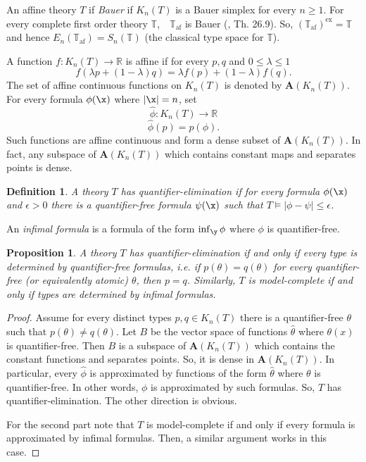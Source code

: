 \documentclass[12pt]{article}
\newtheorem{proposition}[theorem]{Proposition}
\newtheorem{definition}[theorem]{Definition}
\def\Rn{\mathbb R}
\begin{document}
An affine theory $T$ if \emph{Bauer} if $K_n(T)$ is a Bauer simplex for every $n\geqslant1$.
For every complete first order theory $\mathbb{T}$,\ \ $\mathbb{T}_{\textrm{af}}$ is Bauer
(\cite{Ibarlucia}, Th. 26.9).
So, $(\mathbb{T}_{\textrm{af}})^{\textrm{ex}}=\mathbb{T}$ and hence
$E_n(\mathbb{T}_{\textrm{af}})=S_n(\mathbb{T})$ (the classical type space for $\mathbb{T}$).

A function $f:K_n(T)\rightarrow\Rn$ is affine if for every $p,q$ and $0\leqslant\lambda\leqslant1$
$$f(\lambda p+(1-\lambda)q)=\lambda f(p)+(1-\lambda)f(q).$$
The set of affine continuous functions on $K_n(T)$ is denoted by $\mathbf{A}(K_n(T))$.
For every formula $\phi(\x)$ where $|\x|=n$, set $$\hat\phi:K_n(T)\rightarrow\Rn$$
$$\hat\phi(p)=p(\phi).$$
Such functions are affine continuous and form a dense subset of $\mathbf{A}(K_n(T))$.
In fact, any subspace of $\mathbf{A}(K_n(T))$ which contains constant maps and separates points
is dense.

\begin{definition} \em{A theory $T$ has \emph{quantifier-elimination} if for every formula $\phi(\x)$ and $\epsilon>0$
there is a quantifier-free formula $\psi(\x)$ such that $T\vDash|\phi-\psi|\leqslant\epsilon$.}
\end{definition}

An \emph{infimal formula} is a formula of the form $\inf_{\y}\phi$ where $\phi$ is quantifier-free.

\begin{proposition}\label{separation}
A theory $T$ has quantifier-elimination if and only if every type is determined by quantifier-free formulas,
i.e. if $p(\theta)=q(\theta)$ for every quantifier-free (or equivalently atomic) $\theta$, then $p=q$.
Similarly, $T$ is model-complete if and only if types are determined by infimal formulas.
\end{proposition}
\begin{proof}
Assume for every distinct types $p,q\in K_n(T)$ there is a quantifier-free $\theta$ such that
$p(\theta)\neq q(\theta)$.
Let $B$ be the vector space of functions $\hat\theta$ where $\theta(x)$ is quantifier-free.
Then $B$ is a subspace of $\mathbf{A}(K_n(T))$ which contains the constant functions and separates points.
So, it is dense in $\mathbf{A}(K_n(T))$. In particular, every $\hat\phi$ is approximated by
functions of the form $\hat\theta$ where $\theta$ is quantifier-free. In other words,
$\phi$ is approximated by such formulas. So, $T$ has quantifier-elimination.
The other direction is obvious.

For the second part note that $T$ is model-complete if and only if every formula
is approximated by infimal formulas. Then, a similar argument works in this case.
\end{proof}
\end{document}
